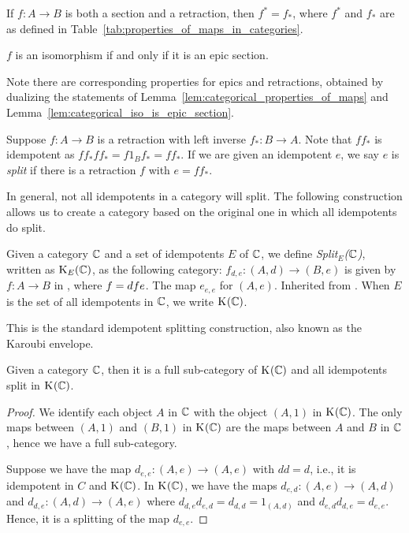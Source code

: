 \begin{lemma}\label{lem:categorical_inverses_are_unique}
  If $f:A \to B$ is both a section and a retraction, then $f^* = f_*$, where $f^*$ and $f_*$ are as
  defined in Table~\ref{tab:properties_of_maps_in_categories}.
\end{lemma}

\begin{lemma}\label{lem:categorical_iso_is_epic_section}
  $f$ is an isomorphism if and only if it is an epic section.
\end{lemma}

Note there are corresponding properties for epics and retractions, obtained by dualizing the
statements of Lemma~\ref{lem:categorical_properties_of_maps} and
Lemma~\ref{lem:categorical_iso_is_epic_section}.

Suppose $f:A \to B$ is a retraction with left inverse $f_*:B \to A$. Note that $f f_*$ is idempotent
as $f f_* f f_* = f 1_B f_* = f f_*$. If we are given an idempotent $e$, we say $e$ is \emph{split}
if there is a retraction $f$ with $e = f f_*$.

In general, not all idempotents in a category will split. The following construction allows us to
create a category based on the original one in which all idempotents do split.

\begin{definition}\label{def:split_category}
  Given a category $\mathbb{C}$ and a set of idempotents $E$ of $\mathbb{C}$, we define \emph{Split${}_E$($\mathbb{C}$)},
  written as $\text{K}_{E}(\mathbb{C})$, as the following category:
    {$f_{d,e}:(A,d)\to(B,e)$ is given by $f:A\to B$ in \C, where $f = d\hspace{0.1pt} f e$.}
    {The map $e_{e,e}$ for $(A,e)$.}
    {Inherited from \C.}
  When $E$ is the set of all idempotents in $\mathbb{C}$, we write $\text{K}_{}(\mathbb{C})$.
\end{definition}
This is the standard idempotent splitting construction, also known as the Karoubi
envelope.

\begin{lemma}\label{lem:split_category_splits_and_has_category}
  Given a category $\mathbb{C}$, then it is a full sub-category of $\text{K}_{}(\mathbb{C})$ and all idempotents split
  in  $\text{K}_{}(\mathbb{C})$.
\end{lemma}
\begin{proof}
  We identify each object $A$ in $\mathbb{C}$ with the object $(A,1)$ in $\text{K}_{}(\mathbb{C})$. The only maps between
  $(A,1)$ and $(B,1)$ in $\text{K}_{}(\mathbb{C})$ are the maps between $A$ and $B$ in $\mathbb{C}$, hence we have a
  full sub-category.

  Suppose we have the map $d_{e,e}: (A,e) \to (A,e)$ with $d d = d$, i.e., it is idempotent in $C$
  and $\text{K}_{}(\mathbb{C})$. In $\text{K}_{}(\mathbb{C})$, we have the maps $d_{e,d}:(A,e) \to (A,d)$ and $d_{d,e}:(A,d) \to
  (A,e)$ where $d_{d,e} d_{e,d} = d_{d,d} = 1_{(A,d)}$ and $d_{e,d} d_{d,e} = d_{e,e}$. Hence,
  it is a splitting of the map  $d_{e,e}$.
\end{proof}

